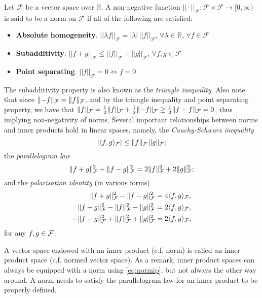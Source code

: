 \begin{definition}[Norms]
	Let $\mathcal F$ be a vector space over $\mathbb R$. A non-negative function $||\cdot||_{\mathcal F}:\mathcal F \times \mathcal F \rightarrow \mathbb [0,\infty)$ is said to be a norm  on $\mathcal F$ if all of the following are satisfied:
	\begin{itemize}
	\item \textbf{Absolute homogeneity}. $||\lambda f||_{\mathcal F} = |\lambda| \, ||f||_{\mathcal F}$, $\forall \lambda \in \mathbb R$, $\forall f \in \mathcal F$
	\item \textbf{Subadditivity}. $||f+g||_{\mathcal F} \leq ||f||_{\mathcal F} + ||g||_{\mathcal F}$, $\forall f,g \in \mathcal F$
	\item \textbf{Point separating}. $||f||_{\mathcal F} = 0 \Leftrightarrow f=0$
	\end{itemize}
\end{definition}

The subadditivity property is also known as the \emph{triangle inequality}.
Also note that since $\lVert-f\rVert_{\mathcal F} = \lVert f\rVert_{\mathcal F}$, and by the triangle inequality and point separating property, we have that $\lVert f\rVert_{\mathcal F} = \frac{1}{2}\lVert f\rVert_{\mathcal F} + \frac{1}{2}\lVert-f\rVert_{\mathcal F} \geq \frac{1}{2}\lVert f - f\rVert_{\mathcal F} = 0$, thus implying non-negativity of norms.
Several important relationships between norms and inner products hold in linear spaces, namely, the \emph{Cauchy-Schwarz inequality}
\[
  |\langle f,g\rangle_{\mathcal F}| \leq \lVert f\rVert_{\mathcal F} \, \lVert g\rVert_{\mathcal F};
\]
the \emph{parallelogram law}
\[
  \lVert f+g\rVert_{\mathcal F}^2 + \lVert f-g\rVert_{\mathcal F}^2 = 2\lVert f\rVert_{\mathcal F}^2 + 2\lVert g\rVert_{\mathcal F}^2;
\]
and the \emph{polarisation identity} (in various forms)
\begin{align*}
  \lVert f+g\rVert_{\mathcal F}^2 - \lVert f-g\rVert_{\mathcal F}^2 &= 4\langle f,g\rangle_{\mathcal F},  \\
  \lVert f+g\rVert_{\mathcal F}^2 - \lVert f\rVert_{\mathcal F}^2 - \lVert g\rVert_{\mathcal F}^2 &= 2\langle f,g\rangle_{\mathcal F}, \\
  - \lVert f-g\rVert_{\mathcal F}^2 + \lVert f\rVert_{\mathcal F}^2 + \lVert g\rVert_{\mathcal F}^2  &= 2\langle f,g\rangle_{\mathcal F},
\end{align*}
for any $f,g\in{\mathcal F}$.

A vector space endowed with an inner product (c.f. norm) is called an inner product space (c.f. normed vector space).
As a remark, inner product spaces can always be equipped with a norm using \cref{eq:normip}, but not always the other way around.
A norm needs to satisfy the parallelogram law for an inner product to be properly defined.

